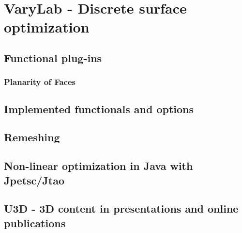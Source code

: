 \documentclass[Thesis.tex]{subfiles}
\begin{document}
\chapter{{\sc VaryLab} - Discrete surface optimization}
\label{chp:varylab}



\section{Functional plug-ins}

\subsection{Planarity of Faces}



\section{Implemented functionals and options}
\section{Remeshing}

\section{Non-linear optimization in {\sc Java} with {\sc Jpetsc/Jtao}}
\label{sec:jpetsctao}

\section{{\sc U3D} - 3D content in presentations and online publications}
\label{sec:u3d}

\subfilebibliography
\end{document}
